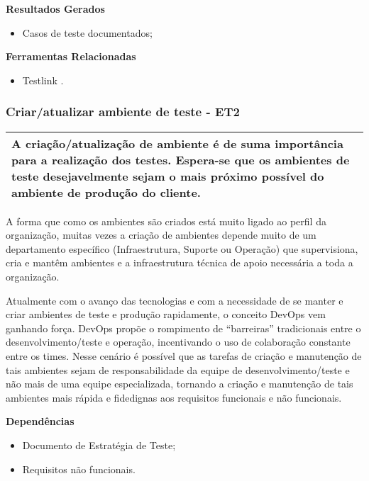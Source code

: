 \textbf{Resultados Gerados}
\begin{itemize}
    \item  Casos de teste documentados;
\end{itemize}

\textbf{Ferramentas Relacionadas}
\begin{itemize}
    \item Testlink \cite{TestLink}.
\end{itemize}

\subsubsection{Criar/atualizar ambiente de teste - ET2}
\label{sec:et2}

\begin{table}[H]
\centering
\begin{tabular}{|p{130mm}|}
\hline
A criação/atualização de ambiente é de suma importância para a realização dos testes. Espera-se que os ambientes de teste desejavelmente sejam o mais próximo possível do ambiente de produção do cliente. \\ 
\hline
\end{tabular}
\end{table}

A forma que como os ambientes são criados está muito ligado ao perfil da organização, muitas vezes a criação de ambientes depende muito de um departamento específico (Infraestrutura, Suporte ou Operação) que supervisiona, cria e mantêm ambientes e a infraestrutura técnica de apoio necessária a toda a organização.

Atualmente com o avanço das tecnologias e com a necessidade de se manter e criar ambientes de teste e produção rapidamente, o conceito DevOps vem ganhando força. DevOps propõe o rompimento de “barreiras” tradicionais entre o desenvolvimento/teste e operação, incentivando o uso de colaboração constante entre os times. Nesse cenário é possível que as tarefas de criação e manutenção de tais ambientes sejam de responsabilidade da equipe de desenvolvimento/teste e não mais de uma equipe especializada, tornando a criação e manutenção de tais ambientes mais rápida e fidedignas aos requisitos funcionais e não funcionais.

\textbf{Dependências}
\begin{itemize}
    \item Documento de Estratégia de Teste;
    \item Requisitos não funcionais.
\end{itemize}

